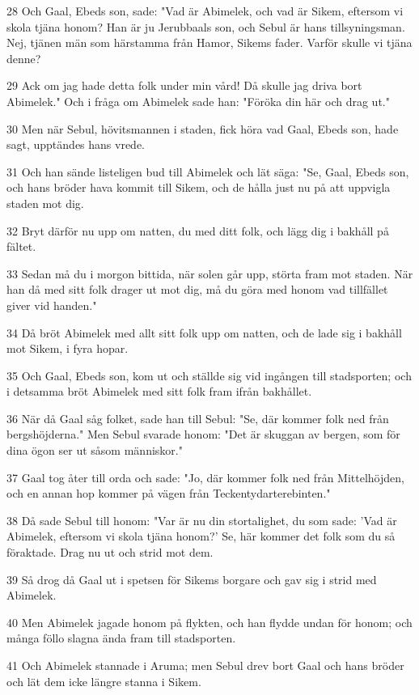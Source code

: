\par 28 Och Gaal, Ebeds son, sade: "Vad är Abimelek, och vad är Sikem, eftersom vi skola tjäna honom? Han är ju Jerubbaals son, och Sebul är hans tillsyningsman. Nej, tjänen män som härstamma från Hamor, Sikems fader. Varför skulle vi tjäna denne?
\par 29 Ack om jag hade detta folk under min vård! Då skulle jag driva bort Abimelek." Och i fråga om Abimelek sade han: "Föröka din här och drag ut."
\par 30 Men när Sebul, hövitsmannen i staden, fick höra vad Gaal, Ebeds son, hade sagt, upptändes hans vrede.
\par 31 Och han sände listeligen bud till Abimelek och lät säga: "Se, Gaal, Ebeds son, och hans bröder hava kommit till Sikem, och de hålla just nu på att uppvigla staden mot dig.
\par 32 Bryt därför nu upp om natten, du med ditt folk, och lägg dig i bakhåll på fältet.
\par 33 Sedan må du i morgon bittida, när solen går upp, störta fram mot staden. När han då med sitt folk drager ut mot dig, må du göra med honom vad tillfället giver vid handen."
\par 34 Då bröt Abimelek med allt sitt folk upp om natten, och de lade sig i bakhåll mot Sikem, i fyra hopar.
\par 35 Och Gaal, Ebeds son, kom ut och ställde sig vid ingången till stadsporten; och i detsamma bröt Abimelek med sitt folk fram ifrån bakhållet.
\par 36 När då Gaal såg folket, sade han till Sebul: "Se, där kommer folk ned från bergshöjderna." Men Sebul svarade honom: "Det är skuggan av bergen, som för dina ögon ser ut såsom människor."
\par 37 Gaal tog åter till orda och sade: "Jo, där kommer folk ned från Mittelhöjden, och en annan hop kommer på vägen från Teckentydarterebinten."
\par 38 Då sade Sebul till honom: "Var är nu din stortalighet, du som sade: 'Vad är Abimelek, eftersom vi skola tjäna honom?' Se, här kommer det folk som du så föraktade. Drag nu ut och strid mot dem.
\par 39 Så drog då Gaal ut i spetsen för Sikems borgare och gav sig i strid med Abimelek.
\par 40 Men Abimelek jagade honom på flykten, och han flydde undan för honom; och många föllo slagna ända fram till stadsporten.
\par 41 Och Abimelek stannade i Aruma; men Sebul drev bort Gaal och hans bröder och lät dem icke längre stanna i Sikem.
